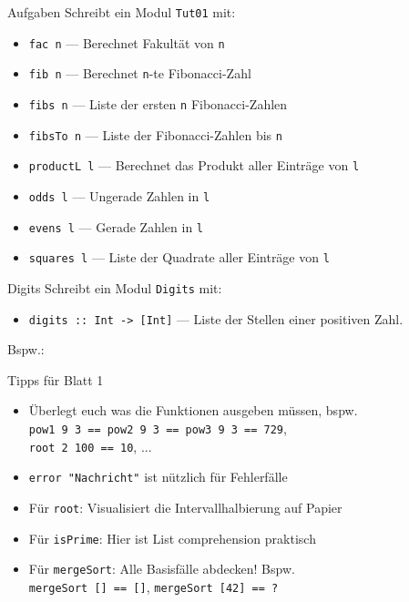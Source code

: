 \documentclass{beamer}
\begin{document}
\begin{frame}{Aufgaben}
        Schreibt ein Modul \texttt{Tut01} mit:

        \begin{itemize}
                \item \texttt{fac n} --- Berechnet Fakultät von \texttt{n}
                \item \texttt{fib n} --- Berechnet \texttt{n}-te Fibonacci-Zahl
                \item \texttt{fibs n} --- Liste der ersten \texttt{n} Fibonacci-Zahlen
                \item \texttt{fibsTo n} --- Liste der Fibonacci-Zahlen bis \texttt{n}
                \item \texttt{productL l} --- Berechnet das Produkt aller Einträge von \texttt{l}
                \item \texttt{odds l} --- Ungerade Zahlen in \texttt{l}
                \item \texttt{evens l} --- Gerade Zahlen in \texttt{l}
                \item \texttt{squares l} --- Liste der Quadrate aller Einträge von \texttt{l}
        \end{itemize}
\end{frame}

\begin{frame}{Digits}
  Schreibt ein Modul \texttt{Digits} mit:

  \begin{itemize}
    \item \texttt{digits :: Int -> [Int]} --- Liste der Stellen einer positiven Zahl.
  \end{itemize}

  Bspw.:

\end{frame}

\begin{frame}{Tipps für Blatt 1}
  \begin{itemize}
    \item Überlegt euch was die Funktionen ausgeben müssen, bspw.\\
      \texttt{pow1 9 3 == pow2 9 3 == pow3 9 3 == 729},\\ \texttt{root 2 100 == 10}, ...
    \item \texttt{error "Nachricht"} ist nützlich für Fehlerfälle
    \item Für \texttt{root}: Visualisiert die Intervallhalbierung auf Papier
    \item Für \texttt{isPrime}: Hier ist List comprehension praktisch
    \item Für \texttt{mergeSort}: Alle Basisfälle abdecken! Bspw.\\
      \texttt{mergeSort [] == []}, \texttt{mergeSort [42] == ?}
  \end{itemize}
\end{frame}
\end{document}
